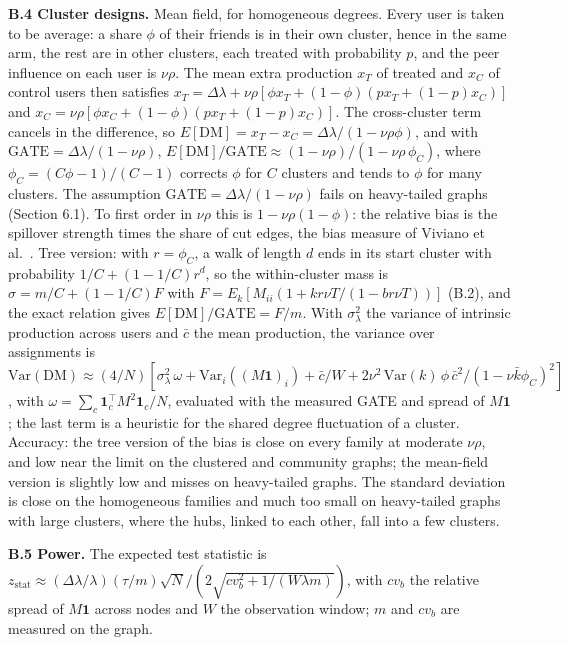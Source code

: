 \documentclass[final,5p,times,twocolumn,number]{elsarticle}
\begin{document}
\textbf{B.4 Cluster designs.} Mean field, for homogeneous degrees. Every user is taken to be average: a share $\phi$  of their friends is in their own cluster, hence in the same arm, the rest are in other clusters, each treated with probability $p$, and the peer influence on each user is $\nu\rho$. The mean extra production $x_T$  of treated and $x_C$  of control users then satisfies $x_T = \Delta\lambda + \nu\rho[\phi x_T + (1 - \phi)(p x_T + (1 - p) x_C)]$  and $x_C = \nu\rho[\phi x_C + (1 - \phi)(p x_T + (1 - p) x_C)]$. The cross-cluster term cancels in the difference, so $E[\mathrm{DM}] = x_T - x_C = \Delta\lambda/(1 - \nu\rho\phi)$, and with $\mathrm{GATE} = \Delta\lambda/(1 - \nu\rho)$, $E[\mathrm{DM}]/\mathrm{GATE} \approx (1 - \nu\rho)/(1 - \nu\rho\,\phi_C)$, where $\phi_C = (C\phi - 1)/(C - 1)$  corrects $\phi$  for $C$  clusters and tends to $\phi$  for many clusters. The assumption $\mathrm{GATE} = \Delta\lambda/(1 - \nu\rho)$  fails on heavy-tailed graphs (Section 6.1). To first order in $\nu\rho$  this is $1 - \nu\rho(1 - \phi)$: the relative bias is the spillover strength times the share of cut edges, the bias measure of Viviano et al.~\cite[Lemma 3.1]{r22}. Tree version: with $r = \phi_C$, a walk of length $d$  ends in its start cluster with probability $1/C + (1 - 1/C)r^d$, so the within-cluster mass is $\sigma = m/C + (1 - 1/C)F$  with $F = E_k[M_{ii}(1 + kr\nu T/(1 - br\nu T))]$  (B.2), and the exact relation gives $E[\mathrm{DM}]/\mathrm{GATE} = F/m$. With $\sigma_\lambda^2$  the variance of intrinsic production across users and $\bar c$  the mean production, the variance over assignments is $\mathrm{Var}(\mathrm{DM}) \approx (4/N)[\sigma_\lambda^2\,\omega + \mathrm{Var}_i((M\mathbf{1})_i) + \bar c/W + 2\nu^2\,\mathrm{Var}(k)\,\phi\,\bar c^2/(1 - \nu\bar k\phi_C)^2]$, with $\omega = \sum_c\mathbf{1}_c^{\top}M^2\mathbf{1}_c/N$, evaluated with the measured GATE and spread of $M\mathbf{1}$; the last term is a heuristic for the shared degree fluctuation of a cluster. Accuracy: the tree version of the bias is close on every family at moderate $\nu\rho$, and low near the limit on the clustered and community graphs; the mean-field version is slightly low and misses on heavy-tailed graphs. The standard deviation is close on the homogeneous families and much too small on heavy-tailed graphs with large clusters, where the hubs, linked to each other, fall into a few clusters.


\textbf{B.5 Power.} The expected test statistic is $z_{\mathrm{stat}} \approx (\Delta\lambda/\lambda)(\tau/m)\sqrt N/(2\sqrt{cv_b^2 + 1/(W\lambda m)})$, with $cv_b$  the relative spread of $M\mathbf{1}$  across nodes and $W$  the observation window; $m$  and $cv_b$  are measured on the graph.
\end{document}
